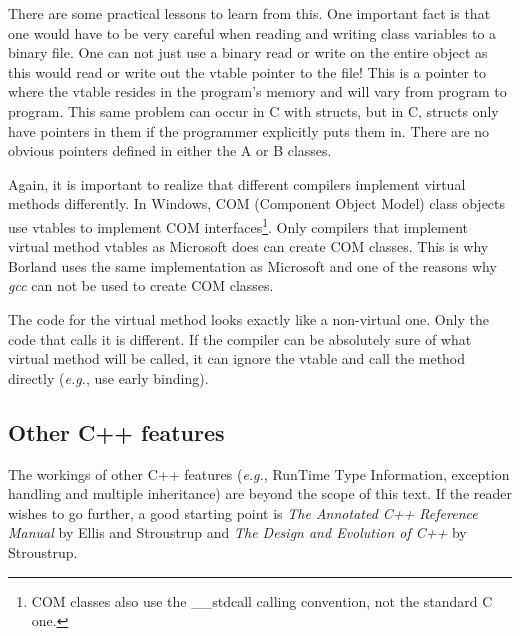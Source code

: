 
There are some practical lessons to learn from this. One important
fact is that one would have to be very careful when reading and writing
class variables to a binary file. One can not just use a binary read
or write on the entire object as this would read or write out the
vtable pointer to the file!  This is a pointer to where the vtable
resides in the program's memory and will vary from program to
program. This same problem can occur in C with structs, but in C,
structs only have pointers in them if the programmer explicitly puts
them in. There are no obvious pointers defined in either the {\code A}
or {\code B} classes.


Again, it is important to realize that different compilers implement
virtual methods differently. In Windows, COM (Component Object Model)
 class objects use vtables to implement COM
interfaces\footnote{COM classes also use the {\code \_\_stdcall}
 calling convention, not the
standard C one.}. Only compilers that implement virtual method vtables
as Microsoft does can create COM classes. This is why Borland uses the
same implementation as Microsoft and one of the reasons why \emph{gcc}
can not be used to create COM classes.

The code for the virtual method looks exactly like a non-virtual one. Only
the code that calls it is different. If the compiler can be absolutely sure
of what virtual method will be called, it can ignore the vtable and call
the method directly (\emph{e.g.}, use early binding).

\subsection{Other C++ features}

The workings of other C++ features (\emph{e.g.}, RunTime Type
Information, exception handling and multiple inheritance) are beyond
the scope of this text. If the reader wishes to go further, a good
starting point is \emph{The Annotated C++ Reference Manual} by Ellis
and Stroustrup and \emph{The Design and Evolution of C++} by
Stroustrup.

